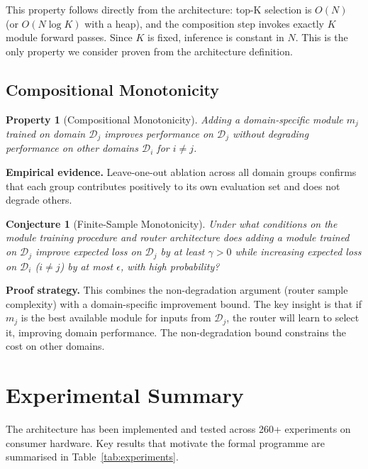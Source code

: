 \documentclass[11pt,a4paper]{article}
\newtheorem{property}{Property}
\newtheorem{conjecture}{Conjecture}
\begin{document}
\noindent This property follows directly from the architecture: top-K selection is $O(N)$ (or $O(N \log K)$ with a heap), and the composition step invokes exactly $K$ module forward passes. Since $K$ is fixed, inference is constant in $N$. This is the only property we consider proven from the architecture definition.

\subsection{Compositional Monotonicity}
\label{sec:monotonicity}

\begin{property}[Compositional Monotonicity]
Adding a domain-specific module $m_j$ trained on domain $\mathcal{D}_j$ improves performance on $\mathcal{D}_j$ without degrading performance on other domains $\mathcal{D}_i$ for $i \neq j$.
\end{property}

\noindent\textbf{Empirical evidence.} Leave-one-out ablation across all domain groups confirms that each group contributes positively to its own evaluation set and does not degrade others.

\begin{conjecture}[Finite-Sample Monotonicity]
Under what conditions on the module training procedure and router architecture does adding a module trained on $\mathcal{D}_j$ improve expected loss on $\mathcal{D}_j$ by at least $\gamma > 0$ while increasing expected loss on $\mathcal{D}_i$ ($i \neq j$) by at most $\epsilon$, with high probability?
\end{conjecture}

\noindent\textbf{Proof strategy.} This combines the non-degradation argument (router sample complexity) with a domain-specific improvement bound. The key insight is that if $m_j$ is the best available module for inputs from $\mathcal{D}_j$, the router will learn to select it, improving domain performance. The non-degradation bound constrains the cost on other domains.

\section{Experimental Summary}
\label{sec:experiments}

The architecture has been implemented and tested across 260+ experiments on consumer hardware. Key results that motivate the formal programme are summarised in Table~\ref{tab:experiments}.
\end{document}
